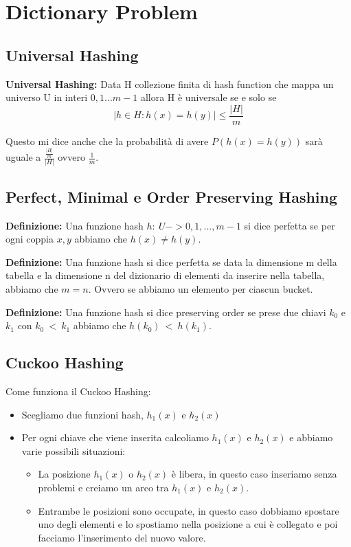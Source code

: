 \documentclass[12pt]{article}
\begin{document}
\section{Dictionary Problem}


\subsection{Universal Hashing}

\textbf{Universal Hashing: } Data H collezione finita di hash function che mappa un universo U in interi ${0,1...m-1}$ allora H è universale se e solo se \\
\begin{equation}
|{h \in H: h(x) = h(y)}| \leq \frac{|H|}{m}
\end{equation}

Questo mi dice anche che la probabilità di avere $P(h(x)=h(y))$ sarà uguale a $\frac{\frac{|H|}{m}}{|H|}$ ovvero $\frac{1}{m}$.



\subsection{Perfect, Minimal e Order Preserving Hashing}

\textbf{Definizione:} Una funzione hash $h:\ U->{0,1,...,m-1}$ si dice perfetta se per ogni coppia $x,y$ abbiamo che $h(x) \neq h(y)$. 

\textbf{Definizione:} Una funzione hash si dice perfetta se data la dimensione m della tabella e la dimensione n del dizionario di elementi da inserire nella tabella, abbiamo che $m=n$. Ovvero se abbiamo un elemento per ciascun bucket.

\textbf{Definizione:} Una funzione hash si dice preserving order se prese due chiavi $k_0$ e $k_1$ con $k_0\ <\ k_1$ abbiamo che $h(k_0)\ <\ h(k_1)$.


\subsection{Cuckoo Hashing}

Come funziona il Cuckoo Hashing:


\begin{itemize}
\item Scegliamo due funzioni hash, $h_1(x)$ e $h_2(x)$
\item Per ogni chiave che viene inserita calcoliamo $h_1(x)$ e $h_2(x)$ e abbiamo varie possibili situazioni:
\begin{itemize}
\item La posizione $h_1(x)$ o $h_2(x)$ è libera, in questo caso inseriamo senza problemi e creiamo un arco tra $h_1(x)$ e $h_2(x)$.
\item Entrambe le posizioni sono occupate, in questo caso dobbiamo spostare uno degli elementi e lo spostiamo nella posizione a cui è collegato e poi facciamo l'inserimento del nuovo valore.
\end{itemize}
\end{itemize}
\end{document}
